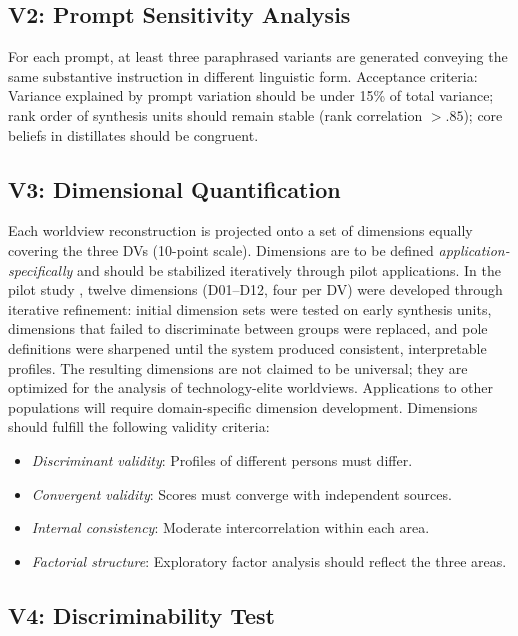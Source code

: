 \documentclass[11pt,a4paper]{article}
\theoremstyle{definition}
\theoremstyle{plain}
\theoremstyle{remark}
\begin{document}
\subsection{V2: Prompt Sensitivity Analysis}

For each prompt, at least three paraphrased variants are generated conveying the same substantive instruction in different linguistic form. Acceptance criteria: Variance explained by prompt variation should be under 15\% of total variance; rank order of synthesis units should remain stable (rank correlation $> .85$); core beliefs in distillates should be congruent.

\subsection{V3: Dimensional Quantification}

Each worldview reconstruction is projected onto a set of dimensions equally covering the three DVs (10-point scale). Dimensions are to be defined \emph{application-specifically} and should be stabilized iteratively through pilot applications. In the pilot study \citep{Geiger2026b}, twelve dimensions (D01--D12, four per DV) were developed through iterative refinement: initial dimension sets were tested on early synthesis units, dimensions that failed to discriminate between groups were replaced, and pole definitions were sharpened until the system produced consistent, interpretable profiles. The resulting dimensions are not claimed to be universal; they are optimized for the analysis of technology-elite worldviews. Applications to other populations will require domain-specific dimension development. Dimensions should fulfill the following validity criteria:

\begin{itemize}[leftmargin=*]
  \item \emph{Discriminant validity}: Profiles of different persons must differ.
  \item \emph{Convergent validity}: Scores must converge with independent sources.
  \item \emph{Internal consistency}: Moderate intercorrelation within each area.
  \item \emph{Factorial structure}: Exploratory factor analysis should reflect the three areas.
\end{itemize}

\subsection{V4: Discriminability Test}
\end{document}
